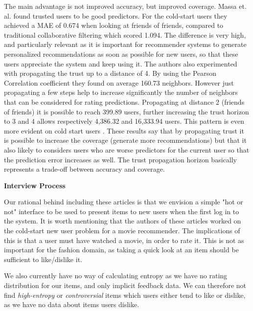 The main advantage is not improved accuracy, but improved coverage. Massa et. al. \cite{Massa2007} found trusted users to be good predictors. For the cold-start users they achieved a MAE of 0.674 when looking at friends of friends, compared to traditional collaborative filtering which scored 1.094. The difference is very high, and particularly relevant as it is important for recommender systems to generate personalized recommendations as soon as possible for new users, so that these users appreciate the system and keep using it. The authors also experimented with
propagating the trust up to a distance of 4. By using the Pearson Correlation
coefficient they found on average 160.73 neighbors. However just propagating a
few steps help to increase significantly the number of neighbors that can be
considered for rating predictions. Propagating at distance 2 (friends of
friends) it is possible to reach 399.89 users, further increasing the trust
horizon to 3 and 4 allows respectively 4,386.32 and 16,333.94 users. This
pattern is even more evident on cold start users \cite{Massa2004}. These
results say that by propagating trust it is possible to increase the coverage
(generate more recommendations) but that it also likely to considers users who are worse
predictors for the current user so that the prediction error increases as well.
The trust propagation horizon basically represents a trade-off between accuracy
and coverage.


\textbf{Interview Process}

Our rational behind including these articles is that we envision a simple "hot or not" interface to be used to present items to new users when the first log in to the system. It is worth mentioning that the authors of these articles worked on the cold-start new user
problem for a movie recommender. The implications of this is that a user must have watched a movie, in order to rate it. This is not as important for the fashion domain, as taking a quick look at an item should be sufficient to like/dislike it.

We also currently have no way of calculating entropy as we have no rating distribution for our items, and only implicit feedback data. We can therefore not find \emph{high-entropy} or \emph{controversial} items which users either tend to like or dislike, as we have no data about items users dislike. 

